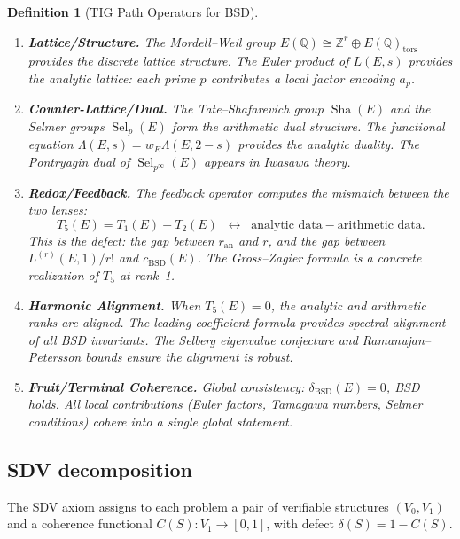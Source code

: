 \documentclass[11pt]{article}
\newtheorem{definition}[theorem]{Definition}
\DeclareMathOperator{\Sha}{Sha}
\DeclareMathOperator{\Sel}{Sel}
\begin{document}
\begin{definition}[TIG Path Operators for BSD]
\label{def:tig-path}
\leavevmode
\begin{enumerate}
  \item[$T_1$] \textbf{Lattice/Structure.}  The Mordell--Weil group
    $E(\mathbb{Q}) \cong \mathbb{Z}^r \oplus E(\mathbb{Q})_{\mathrm{tors}}$
    provides the discrete lattice structure.  The Euler product of $L(E,s)$
    provides the analytic lattice: each prime $p$ contributes a local factor
    encoding $a_p$.

  \item[$T_2$] \textbf{Counter-Lattice/Dual.}  The Tate--Shafarevich group
    $\Sha(E)$ and the Selmer groups $\Sel_p(E)$ form the arithmetic dual
    structure.  The functional equation $\Lambda(E,s) = w_E \Lambda(E,2-s)$
    provides the analytic duality.  The Pontryagin dual of $\Sel_{p^\infty}(E)$
    appears in Iwasawa theory.

  \item[$T_5$] \textbf{Redox/Feedback.}  The feedback operator computes the
    mismatch between the two lenses:
    \[
      T_5(E) = T_1(E) - T_2(E)
      \;\;\longleftrightarrow\;\;
      \text{analytic data} - \text{arithmetic data}.
    \]
    This is the \emph{defect}: the gap between $r_{\mathrm{an}}$ and $r$, and
    the gap between $L^{(r)}(E,1)/r!$ and $c_{\mathrm{BSD}}(E)$.  The Gross--Zagier
    formula is a concrete realization of $T_5$ at rank~1.

  \item[$T_7$] \textbf{Harmonic Alignment.}  When $T_5(E) = 0$, the analytic
    and arithmetic ranks are aligned.  The leading coefficient formula provides
    spectral alignment of all BSD invariants.  The Selberg eigenvalue conjecture
    and Ramanujan--Petersson bounds ensure the alignment is robust.

  \item[$T_9$] \textbf{Fruit/Terminal Coherence.}  Global consistency:
    $\delta_{\mathrm{BSD}}(E) = 0$, BSD holds.  All local contributions (Euler
    factors, Tamagawa numbers, Selmer conditions) cohere into a single global
    statement.
\end{enumerate}
\end{definition}

\subsection{SDV decomposition}

The SDV axiom assigns to each problem a pair of verifiable structures
$(V_0, V_1)$ and a coherence functional $C(S) : V_1 \to [0,1]$, with defect
$\delta(S) = 1 - C(S)$.
\end{document}
